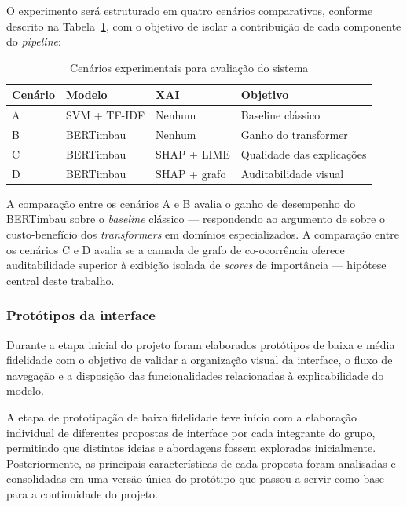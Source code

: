 \documentclass[
    12pt,                %
    openright,           %
    oneside,             %
    a4paper,             %
    english,             %
    brazil               %
]{abntex2}
\begin{document}
O experimento será estruturado em quatro cenários comparativos, conforme descrito na Tabela~\ref{tab:cenarios}, com o objetivo de isolar a contribuição de cada componente do \textit{pipeline}:

\begin{table}[H]
\centering
\caption{Cenários experimentais para avaliação do sistema}
\label{tab:cenarios}
\begin{tabular}{p{1.5cm} p{3.5cm} p{3.5cm} p{4.5cm}}
\toprule
\textbf{Cenário} & \textbf{Modelo} & \textbf{XAI} & \textbf{Objetivo} \\
\midrule
A & SVM + TF-IDF & Nenhum & Baseline clássico \\
B & BERTimbau & Nenhum & Ganho do transformer \\
C & BERTimbau & SHAP + LIME & Qualidade das explicações \\
D & BERTimbau & SHAP + grafo & Auditabilidade visual \\
\bottomrule
\end{tabular}
\end{table}

A comparação entre os cenários A e B avalia o ganho de desempenho do BERTimbau sobre o \textit{baseline} clássico — respondendo ao argumento de  sobre o custo-benefício dos \textit{transformers} em domínios especializados. A comparação entre os cenários C e D avalia se a camada de grafo de co-ocorrência oferece auditabilidade superior à exibição isolada de \textit{scores} de importância — hipótese central deste trabalho.

\subsubsection{Protótipos da interface}

Durante a etapa inicial do projeto foram elaborados protótipos de baixa e média fidelidade com o objetivo de validar a organização visual da interface, o fluxo de navegação e a disposição das funcionalidades relacionadas à explicabilidade do modelo.

A etapa de prototipação de baixa fidelidade teve início com a elaboração individual de diferentes propostas de interface por cada integrante do grupo, permitindo que distintas ideias e abordagens fossem exploradas inicialmente. Posteriormente, as principais características de cada proposta foram analisadas e consolidadas em uma versão única do protótipo que passou a servir como base para a continuidade do projeto.
\end{document}
